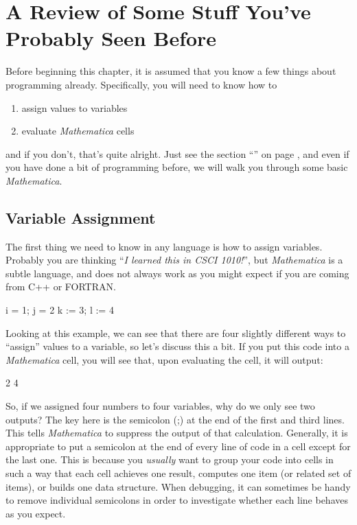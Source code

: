 \chapter[Stuff You've Seen Before]{A Review of Some Stuff You've Probably Seen Before}
\label{chap:SeenBefore}

Before beginning this chapter, it is assumed that you know a few things about programming already. Specifically, you will need to know how to
\begin{enumerate}
	   \item assign values to variables
	   \item evaluate \emph{Mathematica} cells
\end{enumerate}
and if you don't, that's quite alright. Just see the section ``\emph{}'' on page \pageref{chap:Prelim}, and even if you have done a bit of programming before, we will walk you through some basic \emph{Mathematica}.

\section{Variable Assignment}
The first thing we need to know in any language is how to assign variables. Probably you are thinking ``\emph{I learned this in CSCI 1010!}'', but \emph{Mathematica} is a subtle language, and does not always work as you might expect if you are coming from C++ or FORTRAN.

\begin{code}
i = 1;
j = 2
k := 3;
l := 4
\end{code}

Looking at this example, we can see that there are four slightly different ways to ``assign'' values to a variable, so let's discuss this a bit. If you put this code into a \emph{Mathematica} cell, you will see that, upon evaluating the cell, it will output:

\begin{code}
2
4
\end{code}

So, if we assigned four numbers to four variables, why do we only see two outputs? The key here is the semicolon (;) at the end of the first and third lines. This tells \emph{Mathematica} to suppress the output of that calculation. Generally, it is appropriate to put a semicolon at the end of every line of code in a cell except for the last one. This is because you \emph{usually} want to group your code into cells in such a way that each cell achieves one result, computes one item (or related set of items), or builds one data structure. When debugging, it can sometimes be handy to remove individual semicolons in order to investigate whether each line behaves as you expect.

